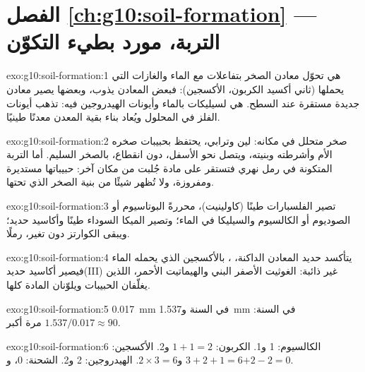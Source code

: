 \section*{الفصل \ref{ch:g10:soil-formation} --- التربة، مورد بطيء التكوّن}

\begin{solution}{exo:g10:soil-formation:1}
 هي تحوّل معادن الصخر بتفاعلات مع الماء والغازات التي يحملها
(ثاني أكسيد الكربون، الأكسجين): فبعض المعادن يذوب، وبعضها يصير معادن جديدة مستقرة
عند السطح.  هي  لسيليكات بالماء وأيونات الهيدروجين فيه:
تذهب أيونات الفلز في المحلول ويُعاد بناء بقية المعدن معدنًا
طينيًا.
\end{solution}

\begin{solution}{exo:g10:soil-formation:2}
 صخر متحلل في مكانه: لين وترابي، يحتفظ بحبيبات صخره الأم وأشرطته وبنيته،
ويتصل نحو الأسفل، دون انقطاع، بالصخر السليم. أما التربة المتكونة في رمل نهري فتستقر
على مادة جُلبت من مكان آخر: حبيباتها مستديرة ومفروزة، ولا تُظهر شيئًا من بنية الصخر
الذي تحتها.
\end{solution}

\begin{solution}{exo:g10:soil-formation:3}
تصير الفلسبارات طينًا (كاولينيت)، محررةً البوتاسيوم أو الصوديوم أو الكالسيوم
والسيليكا في الماء؛ وتصير الميكا السوداء طينًا وأكاسيد حديد؛ ويبقى الكوارتز دون
تغير، رملًا.
\end{solution}

\begin{solution}{exo:g10:soil-formation:4}
يتأكسد حديد المعادن الداكنة، ، بالأكسجين الذي يحمله الماء فيصير أكاسيد
حديد(III) غير ذائبة: الغوثيت الأصفر البني والهيماتيت الأحمر، اللذين يغلّفان الحبيبات
ويلوّنان المادة كلها.
\end{solution}

\begin{solution}{exo:g10:soil-formation:5}
\qty{0.017}{mm} في السنة و\qty{1.537}{mm} في السنة: $1.537/0.017 \approx 90$
مرة أكبر.
\end{solution}

\begin{solution}{exo:g10:soil-formation:6}
الكالسيوم: 1 و1. الكربون: $1 + 1 = 2$ و2. الأكسجين: $3 + 2 + 1 = 6$
و$2 \times 3 = 6$. الهيدروجين: 2 و2. الشحنة: 0، و$+2 - 2 = 0$.
\end{solution}

